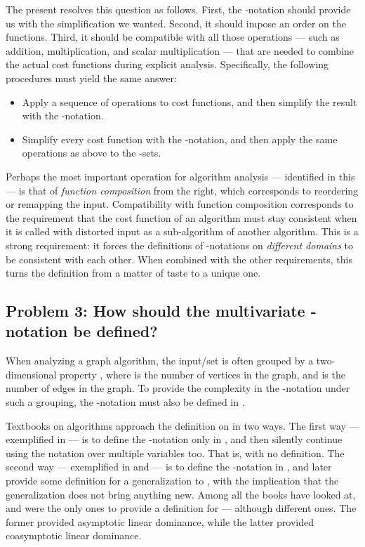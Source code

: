 \documentclass[b5paper, english, oneside]{memoir}
\begin{document}
The present \manuscript{} resolves this question as follows. First, the -notation should provide us with the simplification we wanted. Second, it should impose an order on the functions. Third, it should be compatible with all those operations --- such as addition, multiplication, and scalar multiplication --- that are needed to combine the actual cost functions during explicit analysis. Specifically, the following procedures must yield the same answer:
\begin{itemize}
\item Apply a sequence of operations to cost functions, and then simplify the result with the -notation.
\item Simplify every cost function with the -notation, and then apply the same operations as above to the -sets.
\end{itemize}

Perhaps the most important operation for algorithm analysis --- identified in this \manuscript{} --- is that of \emph{function composition} from the right, which corresponds to reordering or remapping the input. Compatibility with function composition corresponds to the requirement that the cost function of an algorithm must stay consistent when it is called with distorted input as a sub-algorithm of another algorithm. This is a strong requirement: it forces the definitions of -notations on \emph{different domains} to be consistent with each other. When combined with the other requirements, this turns the definition from a matter of taste to a unique one.

\subsection{Problem 3: How should the multivariate -notation be defined?}

When analyzing a graph algorithm, the input\-/set is often grouped by a two-dimensional property , where  is the number of vertices in the graph, and  is the number of edges in the graph. To provide the complexity in the -notation under such a grouping, the -notation must also be defined in .

Textbooks on algorithms approach the definition on  in two ways. The first way --- exemplified in \cite[page 312]{DesignAndAnalysisOfComputerAlgorithms} --- is to define the -notation only in , and then silently continue using the notation over multiple variables too. That is, with no definition. The second way --- exemplified in \cite{IntroAlgo} and \cite{IntroAlgo2009} --- is to define the -notation in , and later provide some definition for a generalization to , with the implication that the generalization does not bring anything new. Among all the books \we{} have looked at, \cite{IntroAlgo} and \cite{IntroAlgo2009} were the only ones to provide a definition for  --- although different ones. The former provided asymptotic linear dominance, while the latter provided coasymptotic linear dominance.
\end{document}
